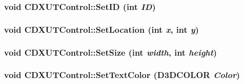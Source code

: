 \hypertarget{class_c_d_x_u_t_control_a0bcbb04531ab93e528be2a085f08d435}{
\subsubsection[{SetID}]{\setlength{\rightskip}{0pt plus 5cm}void CDXUTControl::SetID ({\bf int} {\em ID})}}
\label{class_c_d_x_u_t_control_a0bcbb04531ab93e528be2a085f08d435}
\hypertarget{class_c_d_x_u_t_control_af2ca522955dcff3847ca6d026fedca99}{
\subsubsection[{SetLocation}]{\setlength{\rightskip}{0pt plus 5cm}void CDXUTControl::SetLocation ({\bf int} {\em x}, \/  {\bf int} {\em y})}}
\label{class_c_d_x_u_t_control_af2ca522955dcff3847ca6d026fedca99}
\hypertarget{class_c_d_x_u_t_control_a47b1e68fca8f2a37499bb12eaad9145d}{
\subsubsection[{SetSize}]{\setlength{\rightskip}{0pt plus 5cm}void CDXUTControl::SetSize ({\bf int} {\em width}, \/  {\bf int} {\em height})}}
\label{class_c_d_x_u_t_control_a47b1e68fca8f2a37499bb12eaad9145d}
\hypertarget{class_c_d_x_u_t_control_a9132bb5d6b1d2bff1f20df33fec8c98b}{
\subsubsection[{SetTextColor}]{\setlength{\rightskip}{0pt plus 5cm}void CDXUTControl::SetTextColor (D3DCOLOR {\em Color})}}
\label{class_c_d_x_u_t_control_a9132bb5d6b1d2bff1f20df33fec8c98b}


